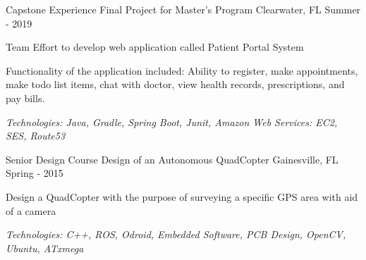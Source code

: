 

\begin{cventries}

	\cventry
		{Capstone Experience} %
		{Final Project for Master's Program} %
		{Clearwater, FL} %
		{Summer - 2019} %
		{
			\begin{cvitems} %
			\item {Team Effort to develop web application called Patient Portal System}
			\item {Functionality of the application included: Ability to register, make appointments, make todo list items, chat with doctor, view health records, prescriptions, and pay bills.}
			\item {\it{Technologies:} Java, Gradle, Spring Boot, Junit, Amazon Web Services: EC2, SES, Route53}
			\end{cvitems}
		}

  \cventry
    {Senior Design Course} %
    {Design of an Autonomous QuadCopter} %
    {Gainesville, FL} %
    {Spring - 2015} %
    {
      \begin{cvitems} %
				\item {Design a QuadCopter with the purpose of surveying a specific GPS area with aid of a camera}
				\item {\it{Technologies:} C++, ROS, Odroid, Embedded Software, PCB Design, OpenCV, Ubuntu, ATxmega}
      \end{cvitems}
    }


\end{cventries}
